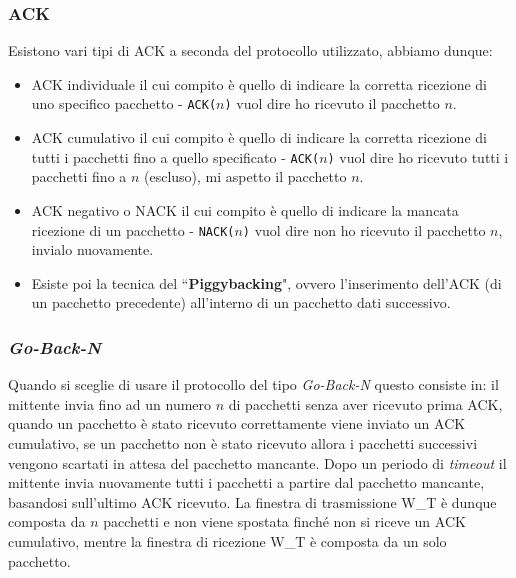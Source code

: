         \subsubsection[ACKnowledgment (\Acrshort*{ACK})]{\acrfull*{ACK}}
            Esistono vari tipi di \Acrshort*{ACK} a seconda del protocollo utilizzato, abbiamo dunque:
            \begin{itemize}
                \item \Acrshort*{ACK} individuale il cui compito è quello di indicare la corretta ricezione di uno specifico pacchetto - \texttt{ACK($n$)} vuol dire ho ricevuto il pacchetto $n$.
                \item \Acrshort*{ACK} cumulativo il cui compito è quello di indicare la corretta ricezione di tutti i pacchetti fino a quello specificato - \texttt{ACK($n$)} vuol dire ho ricevuto tutti i pacchetti fino a $n$ (escluso), mi aspetto il pacchetto $n$.
                \item \Acrshort*{ACK} negativo o \Acrshort*{NACK} il cui compito è quello di indicare la mancata ricezione di un pacchetto - \texttt{NACK($n$)} vuol dire non ho ricevuto il pacchetto $n$, invialo nuovamente.
                \item Esiste poi la tecnica del ``\textbf{Piggybacking}", ovvero l'inserimento dell'\Acrshort*{ACK} (di un pacchetto precedente) all'interno di un pacchetto dati successivo.
            \end{itemize}
        \subsubsection{\textit{Go-Back-N}}
            Quando si sceglie di usare il protocollo del tipo \textit{Go-Back-N} questo consiste in: il mittente invia fino ad un numero $ n $ di pacchetti senza aver ricevuto prima \Acrshort*{ACK}, quando un pacchetto è stato ricevuto correttamente viene inviato un \Acrshort*{ACK} cumulativo, se un pacchetto non è stato ricevuto allora i pacchetti successivi vengono scartati in attesa del pacchetto mancante. Dopo un periodo di \textit{timeout} il mittente invia nuovamente tutti i pacchetti a partire dal pacchetto mancante, basandosi sull'ultimo \Acrshort*{ACK} ricevuto. La finestra di trasmissione \Acrshort*{W_T} è dunque composta da $ n $ pacchetti e non viene spostata finché non si riceve un \Acrshort*{ACK} cumulativo, mentre la finestra di ricezione \Acrshort*{W_T} è composta da un solo pacchetto.

